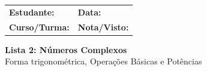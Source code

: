 \documentclass[12pt,a4paper]{article}
\begin{document}
\begin{tcolorbox}[colback=bglight, colframe=primary, boxrule=1pt, arc=3pt]
  \sffamily\small
  \begin{tabular}{@{}p{} p{}@{}}
    \textbf{Estudante:} \hrulefill & \textbf{Data:} \hrulefill \\[0.25cm]
    \textbf{Curso/Turma:} \hrulefill & \textbf{Nota/Visto:} \hrulefill
  \end{tabular}
\end{tcolorbox}

\begin{center}
  {\LARGE\bfseries\color{primary} Lista 2: Números Complexos} \\[0.1cm]
  {\small\sffamily\color{gray} Forma trigonométrica, Operações Básicas e Potências}
\end{center}


\vspace{0.2cm}

\end{document}
